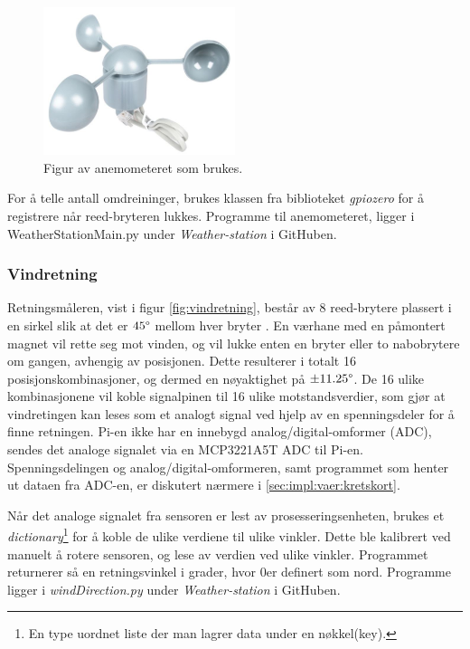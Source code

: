 \begin{figure}[H]
    \centering
    \includegraphics[width=0.5\textwidth]{implementering/anemometer.png}
    \caption{Figur av anemometeret som brukes.}
    \label{fig:anemometer}
\end{figure}

For å telle antall omdreininger, brukes klassen  fra biblioteket \textit{gpiozero} for å registrere når reed-bryteren lukkes. Programme til anemometeret, ligger i WeatherStationMain.py under \textit{Weather-station} i GitHuben\cite{GitHub}.


\subsubsection{Vindretning}\label{sec:impl:vaer:vindret}

Retningsmåleren, vist i figur \ref{fig:vindretning}, består av 8 reed-brytere plassert i en sirkel slik at det er $45\degree$ mellom hver bryter \cite{weather}. 
En værhane med en påmontert magnet vil rette seg mot vinden, og vil lukke enten en bryter eller to nabobrytere om gangen, avhengig av posisjonen.
Dette resulterer i totalt 16 posisjonskombinasjoner, og dermed en nøyaktighet på $\pm 11.25\degree$. 
De 16 ulike kombinasjonene vil koble signalpinen til 16 ulike motstandsverdier, som gjør at vindretingen kan leses som et analogt signal ved hjelp av en spenningsdeler for å finne retningen. 
Pi-en ikke har en innebygd analog/digital-omformer (ADC), sendes det analoge signalet via en MCP3221A5T ADC til Pi-en.
Spenningsdelingen og analog/digital-omformeren, samt programmet som henter ut dataen fra ADC-en, er diskutert nærmere i \autoref{sec:impl:vaer:kretskort}.

Når det analoge signalet fra sensoren er lest av prosesseringsenheten, brukes et \textit{dictionary}\footnote{En type uordnet liste der man lagrer data under en nøkkel(key)\cite{dictionaries}.} for å koble de ulike verdiene til ulike vinkler.
Dette ble kalibrert ved manuelt å rotere sensoren, og lese av verdien ved ulike vinkler. 
Programmet returnerer så en retningsvinkel i grader, hvor 0\degree er definert som nord. 
Programme ligger i \textit{windDirection.py} under \textit{Weather-station} i GitHuben\cite{GitHub}.

